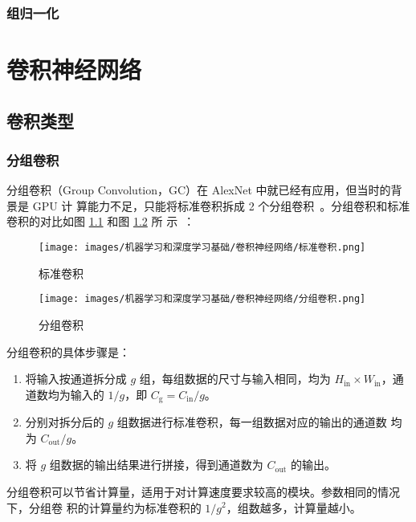 \subsection{组归一化}
\label{sub:GN}

\chapter{卷积神经网络}

\section{卷积类型}

\subsection{分组卷积}

分组卷积（Group Convolution，GC）在 AlexNet 中就已经有应用，但当时的背景是 GPU 计
算能力不足，只能将标准卷积拆成 2 个分组卷积~。分组卷积和标准
卷积的对比如图 \ref{fig:normal-conv} 和图 \ref{fig:group-conv} 所
示~：

\begin{figure}[ht]
  \centering
  \texttt{[image: images/机器学习和深度学习基础/卷积神经网络/标准卷积.png]}
  \caption{标准卷积}
  \label{fig:normal-conv}
\end{figure}

\begin{figure}[ht]
  \centering
  \texttt{[image: images/机器学习和深度学习基础/卷积神经网络/分组卷积.png]}
  \caption{分组卷积}
  \label{fig:group-conv}
\end{figure}

分组卷积的具体步骤是：

\begin{enumerate}
  \item 将输入按通道拆分成 $g$ 组，每组数据的尺寸与输入相同，均为 $H_{\mathrm{in}}
    \times W_{\mathrm{in}}$，通道数均为输入的 $ 1/g $，即 $
    C_{\mathrm{g}} = C_{\mathrm{in}} / g $。
  \item 分别对拆分后的 $g$ 组数据进行标准卷积，每一组数据对应的输出的通道数
    均为 $ C_{\mathrm{out}}/g $。
  \item 将 $g$ 组数据的输出结果进行拼接，得到通道数为 $C_{\mathrm{out}}$
    的输出。
\end{enumerate}

分组卷积可以节省计算量，适用于对计算速度要求较高的模块。参数相同的情况下，分组卷
积的计算量约为标准卷积的 $ 1 / g^2 $，组数越多，计算量越小。

